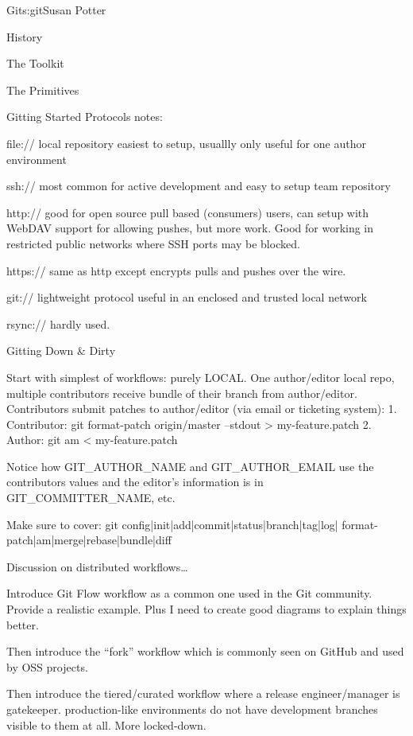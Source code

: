 \begin{aosachapter}{Git}{s:git}{Susan Potter}
\begin{aosasect1}{History}
\begin{aosasect1}{The Toolkit}
\begin{aosasect1}{The Primitives}
\begin{aosasect1}{Gitting Started}
Protocols notes:
\begin{aosaitemize}
  \item file:// local repository easiest to setup, usuallly only useful for
    one author environment
  \item ssh:// most common for active development and easy to setup team repository
  \item http:// good for open source pull based (consumers) users, can setup with
    WebDAV support for allowing pushes, but more work. Good for working in
    restricted public networks where SSH ports may be blocked.
  \item https:// same as http except encrypts pulls and pushes over the wire.
  \item git:// lightweight protocol useful in an enclosed and trusted local network
  \item rsync:// hardly used.
\end{aosaitemize}

\end{aosasect1}

\begin{aosasect1}{Gitting Down \& Dirty}

Start with simplest of workflows: purely LOCAL. One author/editor local repo,
multiple contributors receive bundle of their branch from author/editor.
Contributors submit patches to author/editor (via email or ticketing system):
1. Contributor: git format-patch origin/master --stdout > my-feature.patch
2. Author: git am < my-feature.patch

Notice how GIT\_AUTHOR\_NAME and GIT\_AUTHOR\_EMAIL use the contributors
values and the editor's information is in GIT\_COMMITTER\_NAME, etc.

Make sure to cover: git config|init|add|commit|status|branch|tag|log|
format-patch|am|merge|rebase|bundle|diff


Discussion on distributed workflows\ldots

Introduce Git Flow workflow as a common one used in the Git community. Provide
a realistic example. Plus I need to create good diagrams to explain things
better.

Then introduce the ``fork'' workflow which is commonly seen on GitHub and
used by OSS projects.

Then introduce the tiered/curated workflow where a release engineer/manager
is gatekeeper. production-like environments do not have development branches
visible to them at all. More locked-down.


\end{aosasect1}
\end{aosasect1}
\end{aosasect1}
\end{aosasect1}
\end{aosachapter}
